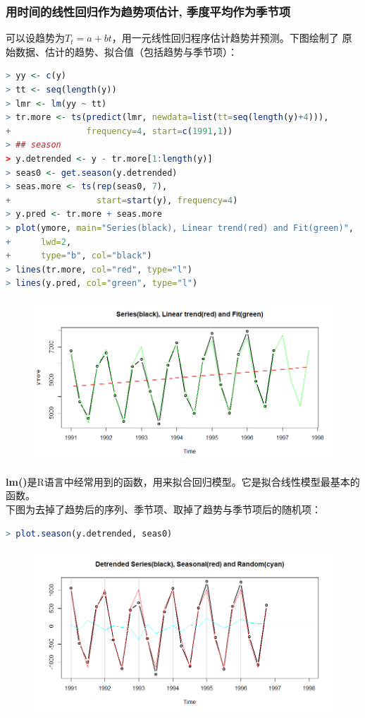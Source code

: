 \documentclass[11pt,a4paper,oneside]{book}
\begin{document}
\subsubsection{用时间的线性回归作为趋势项估计, 季度平均作为季节项}
可以设趋势为$ T_t = a + bt $，用一元线性回归程序估计趋势并预测。下图绘制了
原始数据、估计的趋势、拟合值（包括趋势与季节项）：
\begin{lstlisting}[language=r]
> yy <- c(y)
> tt <- seq(length(y))
> lmr <- lm(yy ~ tt)
> tr.more <- ts(predict(lmr, newdata=list(tt=seq(length(y)+4))),
+               frequency=4, start=c(1991,1))
> ## season
> y.detrended <- y - tr.more[1:length(y)]
> seas0 <- get.season(y.detrended)
> seas.more <- ts(rep(seas0, 7),
+                 start=start(y), frequency=4)
> y.pred <- tr.more + seas.more
> plot(ymore, main="Series(black), Linear trend(red) and Fit(green)",
+      lwd=2,
+      type="b", col="black")
> lines(tr.more, col="red", type="l")
> lines(y.pred, col="green", type="l")
\end{lstlisting}
\begin{figure}[H]
	\centering
	\includegraphics[width=\textwidth]{5.png}
\end{figure}

\textbf{lm()}是R语言中经常用到的函数，用来拟合回归模型。它是拟合线性模型最基本的函数。\\

下图为去掉了趋势后的序列、季节项、取掉了趋势与季节项后的随机项：
\begin{lstlisting}[language=r]
> plot.season(y.detrended, seas0)
\end{lstlisting}
\begin{figure}[H]
	\centering
	\includegraphics[width=\textwidth]{6.png}
\end{figure}
\end{document}
